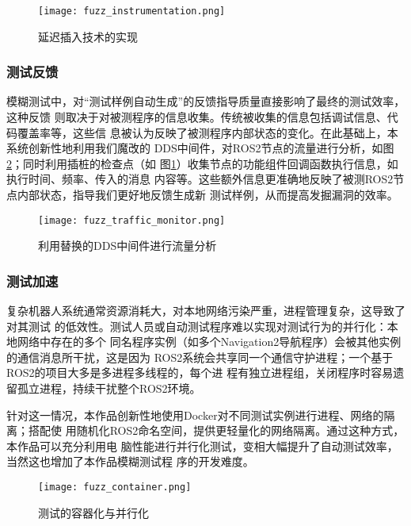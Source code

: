 \begin{figure}[h]
    \centering
    \texttt{[image: fuzz\_instrumentation.png]}
    \caption{延迟插入技术的实现}
    \label{pic:fi}
\end{figure}

\subsubsection{测试反馈}
模糊测试中，对“测试样例自动生成”的反馈指导质量直接影响了最终的测试效率，这种反馈
则取决于对被测程序的信息收集。传统被收集的信息包括调试信息、代码覆盖率等，这些信
息被认为反映了被测程序内部状态的变化。在此基础上，本系统创新性地利用我们魔改的
DDS中间件，对ROS2节点的流量进行分析，如图\ref{pic:ftm}；同时利用插桩的检查点（如
图\ref{pic:fi}）收集节点的功能组件回调函数执行信息，如执行时间、频率、传入的消息
内容等。这些额外信息更准确地反映了被测ROS2节点内部状态，指导我们更好地反馈生成新
测试样例，从而提高发掘漏洞的效率。

\begin{figure}[h]
    \centering
    \texttt{[image: fuzz\_traffic\_monitor.png]}
    \caption{利用替换的DDS中间件进行流量分析}
    \label{pic:ftm}
\end{figure}


\subsubsection{测试加速}

复杂机器人系统通常资源消耗大，对本地网络污染严重，进程管理复杂，这导致了对其测试
的低效性。测试人员或自动测试程序难以实现对测试行为的并行化：本地网络中存在的多个
同名程序实例（如多个Navigation2导航程序）会被其他实例的通信消息所干扰，这是因为
ROS2系统会共享同一个通信守护进程；一个基于ROS2的项目大多是多进程多线程的，每个进
程有独立进程组，关闭程序时容易遗留孤立进程，持续干扰整个ROS2环境。

针对这一情况，本作品创新性地使用Docker对不同测试实例进行进程、网络的隔离；搭配使
用随机化ROS2命名空间，提供更轻量化的网络隔离。通过这种方式，本作品可以充分利用电
脑性能进行并行化测试，变相大幅提升了自动测试效率，当然这也增加了本作品模糊测试程
序的开发难度。

\begin{figure}[h]
    \centering
    \texttt{[image: fuzz\_container.png]}
    \caption{测试的容器化与并行化}
    \label{pic:fc}
\end{figure}
